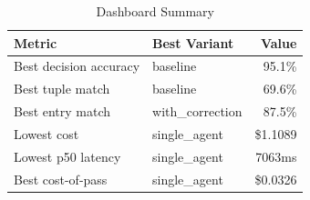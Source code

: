 \begin{table}[htbp]
\centering
\caption{Dashboard Summary}
\label{tab:summary}
\begin{tabular}{l l r}
\toprule
Metric & Best Variant & Value \\
\midrule
  Best decision accuracy & baseline & 95.1\% \\
  Best tuple match & baseline & 69.6\% \\
  Best entry match & with\_correction & 87.5\% \\
  Lowest cost & single\_agent & \$1.1089 \\
  Lowest p50 latency & single\_agent & 7063ms \\
  Best cost-of-pass & single\_agent & \$0.0326 \\
\bottomrule
\end{tabular}
\end{table}
